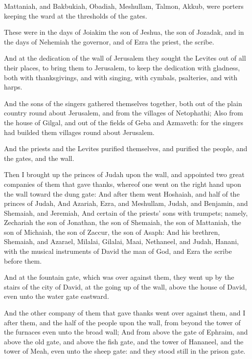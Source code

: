 \Verse Mattaniah, and Bakbukiah, Obadiah, Meshullam, Talmon, Akkub, were porters keeping the ward at the thresholds of the gates.

\Verse These were in the days of Joiakim the son of Jeshua, the son of Jozadak, and in the days of Nehemiah the governor, and of Ezra the priest, the scribe.

\Verse And at the dedication of the wall of Jerusalem they sought the Levites out of all their places, to bring them to Jerusalem, to keep the dedication with gladness, both with thanksgivings, and with singing, with cymbals, psalteries, and with harps.

\Verse And the sons of the singers gathered themselves together, both out of the plain country round about Jerusalem, and from the villages of Netophathi; \Verse Also from the house of Gilgal, and out of the fields of Geba and Azmaveth: for the singers had builded them villages round about Jerusalem.

\Verse And the priests and the Levites purified themselves, and purified the people, and the gates, and the wall.

\Verse Then I brought up the princes of Judah upon the wall, and appointed two great companies of them that gave thanks, whereof one went on the right hand upon the wall toward the dung gate: \Verse And after them went Hoshaiah, and half of the princes of Judah, \Verse And Azariah, Ezra, and Meshullam, \Verse Judah, and Benjamin, and Shemaiah, and Jeremiah, \Verse And certain of the priests' sons with trumpets; namely, Zechariah the son of Jonathan, the son of Shemaiah, the son of Mattaniah, the son of Michaiah, the son of Zaccur, the son of Asaph: \Verse And his brethren, Shemaiah, and Azarael, Milalai, Gilalai, Maai, Nethaneel, and Judah, Hanani, with the musical instruments of David the man of God, and Ezra the scribe before them.

\Verse And at the fountain gate, which was over against them, they went up by the stairs of the city of David, at the going up of the wall, above the house of David, even unto the water gate eastward.

\Verse And the other company of them that gave thanks went over against them, and I after them, and the half of the people upon the wall, from beyond the tower of the furnaces even unto the broad wall; \Verse And from above the gate of Ephraim, and above the old gate, and above the fish gate, and the tower of Hananeel, and the tower of Meah, even unto the sheep gate: and they stood still in the prison gate.

